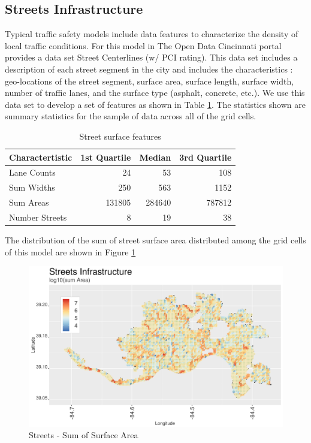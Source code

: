 \documentclass{llncs}
\begin{document}

\subsection{Streets Infrastructure}

Typical traffic safety models include data features to characterize the density of local traffic conditions. For this model in The Open Data Cincinnati portal provides a data set Street Centerlines (w/ PCI rating). This data set includes a description of each street segment in the city and includes the characteristics : geo-locations of the street segment, surface area, surface length, surface width, number of traffic lanes, and the surface type (asphalt, concrete, etc.). We use this data set to develop a set of features as shown in Table \ref{table : streetFeatures}. The statistics shown are summary statistics for the sample of data across all of the grid cells.

\FloatBarrier
\begin{table}[!h]
\begin{center}
\caption{Street surface features}
\label{table : streetFeatures}
\begin{tabular}{lrrr}
\hline
\rule{0pt}{12pt}
Charactertistic	&	1st Quartile	&	Median	&	3rd Quartile	\\[2pt]
\hline
Lane Counts	&	24	&	53	&	108	\\
Sum Widths	&	250	&	563	&	1152	\\
Sum Areas	&	131805	&	284640	&	787812	\\
Number Streets	&	8	&	19	&	38	\\[2pt]
\hline
\end{tabular}
\end{center}
\end{table}
\FloatBarrier
%


The distribution of the sum of street surface area distributed among the grid cells of this model are shown in Figure \ref{figure : streetsSumArea}

\FloatBarrier
\begin{figure}
 	\includegraphics[width=\textwidth, height=\textheight, keepaspectratio]{streetsSumArea}
 	\caption{Streets - Sum of Surface Area}
	\label{figure : streetsSumArea}
\end{figure}
\FloatBarrier
\end{document}
